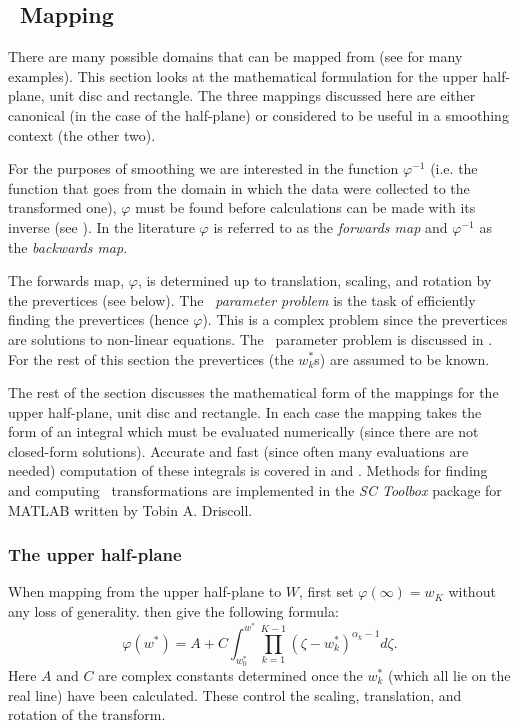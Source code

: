 
\subsection{\sch\ Mapping}
\label{schparprob}
There are many possible domains that can be mapped from (see \cite[section 4]{driscoll} for \label{cor-3s12}many examples). This section looks at the mathematical formulation for the upper half-plane, unit disc and rectangle. The three mappings discussed here are either canonical (in the case of the half-plane) or considered to be useful in a smoothing context (the other two).

For the purposes of smoothing we are interested in the function $\varphi^{-1}$ (i.e. the function that goes from the domain in which the data were collected to the transformed one), $\varphi$ must be found before calculations can be made with its inverse (see ). In the literature $\varphi$ is referred to as the \emph{forwards map} and $\varphi^{-1}$ as the \emph{backwards map}.

The forwards map, $\varphi$, is determined up to translation, scaling, and rotation by the prevertices (see below). \label{cor-3s13-1}The \emph{\sch\ parameter problem} is the task of efficiently finding the prevertices (hence $\varphi$). This is a complex problem since the prevertices are solutions to non-linear equations. The \sch\ parameter problem is discussed in . For the rest of this section the prevertices (the $w^*_k$s) are assumed to be known. 

The rest of the section discusses the mathematical form of the mappings for the upper half-plane, unit disc and rectangle. In each case the mapping takes the form of an integral which must be evaluated numerically (since there are not closed-form solutions). Accurate and fast (since often many evaluations are needed) computation of these integrals is covered in  and . Methods for finding and computing \sch\ transformations are implemented in the \textit{SC Toolbox} package for MATLAB written by Tobin A. Driscoll\label{cor-soft2}.

\subsubsection{The upper half-plane}
\label{sc-parprob}

When mapping from the upper half-plane\label{cor-3s14-1} to $W$\label{cor-3s1-1}, first set $\varphi(\infty) = w_K$ without any loss of generality.  then give the following formula:
\begin{equation}
\varphi(w^*) = A + C \int^{w^*}_{w^*_0} \prod_{k=1}^{K-1} \left (\zeta-w^*_k \right )^{\alpha_k-1} d\zeta.
\end{equation}
Here $A$ and $C$ are complex constants determined once the $w^*_k$ (which all lie on the real line\label{cor-3s13-2}) have been calculated. These control the scaling, translation, and rotation of the transform. 

